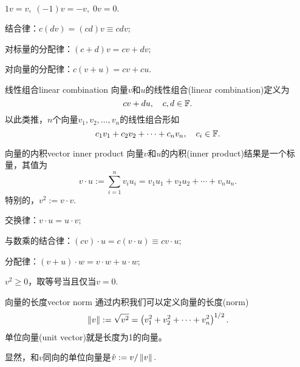 \begin{compactitem}
	\item $1v=v,\;(-1)v=-v,\;0v=0.$
	\item 结合律：$c(dv)=(cd)v\equiv cdv;$
	\item 对标量的分配律：$(c+d)v=cv+dv;$
	\item 对向量的分配律：$c(v+u)=cv+cu.$
\end{compactitem}
\begin{definition}{线性组合}{linear combination}
	向量$v$和$u$的线性组合(linear combination)定义为
	\[
		cv+du,\quad c,d\in\mathbb F.
	\]
	以此类推，$n$个向量$v_1,v_2,\ldots,v_n$的线性组合形如
	\[
		c_1v_1+c_2v_2+\cdots+c_nv_n,\quad c_i\in\mathbb F.
	\]
\end{definition}
\begin{definition}{向量的内积}{vector inner product}
	向量$v$和$u$的内积(inner product)结果是一个标量，其值为
	\begin{equation}
		v\cdot u:=\sum_{i=1}^nv_iu_i=v_1u_1+v_2u_2+\cdots+v_nu_n.
	\end{equation}
	特别的，$v^2:=v\cdot v.$
\end{definition}
\begin{compactitem}
	\item 交换律：$v\cdot u=u\cdot v;$
	\item 与数乘的结合律：$(cv)\cdot u=c(v\cdot u)\equiv cv\cdot u;$
	\item 分配律：$(v+u)\cdot w=v\cdot w+u\cdot w;$
	\item $v^2\geqslant 0$，取等号当且仅当$v=0.$
\end{compactitem}
\begin{definition}{向量的长度}{vector norm}
	通过内积我们可以定义向量的长度(norm)
	\begin{equation}
		\left\lVert v\right\rVert:=\sqrt{v^2}=\left(v_1^2+v_2^2+\cdots+v_n^2\right)^{1/2}.
	\end{equation}
	单位向量(unit vector)就是长度为1的向量。
\end{definition}
显然，和$v$同向的单位向量是$\hat v:=v/\left\lVert v\right\rVert.$
\iffalse
\begin{definition}{两向量间的夹角}{angle between two vectors}
	定义向量的夹角$\theta\in[0,\pi]$满足
	\[
		\cos\theta=\frac{v\cdot u}{\norm v\norm u}.
	\]
\end{definition}
\begin{theorem}{Cauchy不等式}{Cauchy Inequality}
	因为$\abs{\cos\theta}\leqslant 1$，故 
	\begin{equation}
		\abs{v\cdot u}\leqslant\norm v\norm u.
	\end{equation}
\end{theorem}
\fi
